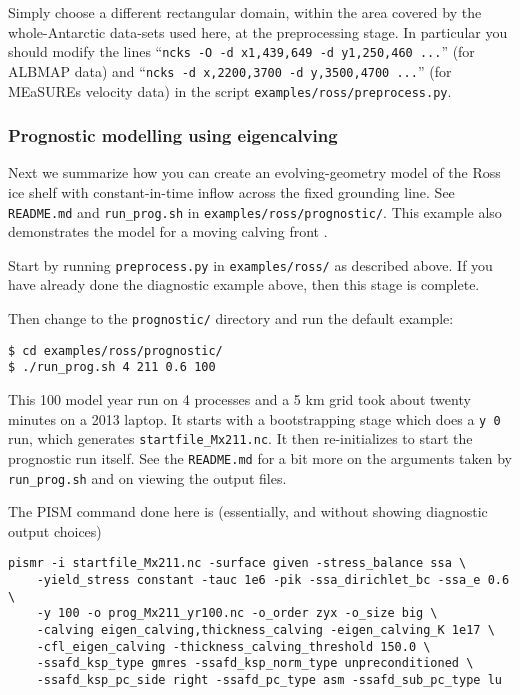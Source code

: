 Simply choose a different rectangular domain, within the area covered by the whole-Antarctic data-sets used here, at the preprocessing stage.  In particular you should modify the lines ``\texttt{ncks -O -d x1,439,649 -d y1,250,460 ...}'' (for ALBMAP data) and ``\texttt{ncks -d x,2200,3700 -d y,3500,4700 ...}'' (for MEaSUREs velocity data) in the script \texttt{examples/ross/preprocess.py}.

\subsubsection*{Prognostic modelling using eigencalving}  Next we summarize how you can create an evolving-geometry model of the Ross ice shelf with constant-in-time inflow across the fixed grounding line.  See \texttt{README.md} and \texttt{run_prog.sh} in \texttt{examples/ross/prognostic/}.  This example also demonstrates the  model for a moving calving front \cite{Levermannetal2012}.

Start by running \texttt{preprocess.py} in \texttt{examples/ross/} as described above.  If you have already done the diagnostic example above, then this stage is complete.

Then change to the \texttt{prognostic/} directory and run the default example:

\begin{verbatim}
$ cd examples/ross/prognostic/
$ ./run_prog.sh 4 211 0.6 100
\end{verbatim}

\noindent This 100 model year run on 4 processes and a 5 km grid took about twenty minutes on a 2013 laptop.  It starts with a bootstrapping stage which does a \texttt{y 0} run, which generates \texttt{startfile_Mx211.nc}.  It then re-initializes to start the prognostic run itself.  See the \texttt{README.md} for a bit more on the arguments taken by \texttt{run_prog.sh} and on viewing the output files.

The PISM command done here is (essentially, and without showing diagnostic output choices)

\begin{verbatim}
pismr -i startfile_Mx211.nc -surface given -stress_balance ssa \
    -yield_stress constant -tauc 1e6 -pik -ssa_dirichlet_bc -ssa_e 0.6 \
    -y 100 -o prog_Mx211_yr100.nc -o_order zyx -o_size big \
    -calving eigen_calving,thickness_calving -eigen_calving_K 1e17 \
    -cfl_eigen_calving -thickness_calving_threshold 150.0 \
    -ssafd_ksp_type gmres -ssafd_ksp_norm_type unpreconditioned \
    -ssafd_ksp_pc_side right -ssafd_pc_type asm -ssafd_sub_pc_type lu
\end{verbatim}

